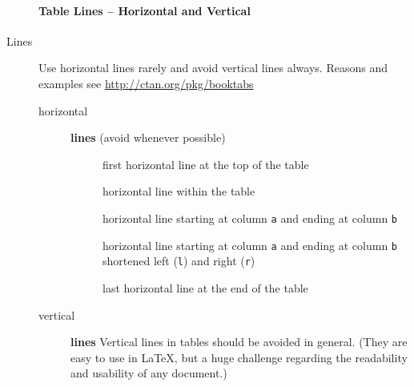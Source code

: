 \begin{description}
   \paragraph{Table Lines -- Horizontal and Vertical}
   \item[Lines] Use horizontal lines rarely and avoid vertical lines always. Reasons and examples see \eg
   \href{http://ctan.org/pkg/booktabs}{http://ctan.org/pkg/booktabs}
   \begin{description}
      \item[horizontal] \textbf{lines} (avoid whenever possible)
      \begin{description}
         \item[] first horizontal line at the top of the table
         \item[] horizontal line within the table
         \item[] horizontal line starting at column \texttt{a}
         and ending at column \texttt{b}
         \item[] horizontal line starting at column \texttt{a}
         and
         ending at column \texttt{b} shortened left (\texttt{l}) and right (\texttt{r})
         \item[] last horizontal line at the end of the table
      \end{description}
      \item[vertical] \textbf{lines} Vertical lines in tables should be avoided in general. (They are easy
      to use in \LaTeX, but a huge challenge regarding the readability and usability of any document.)
   \end{description}%
\end{description}%

\newpage

